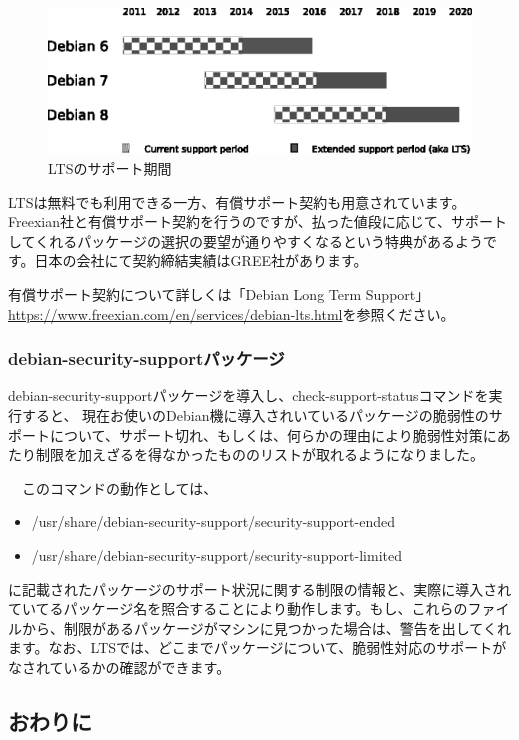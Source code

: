 \documentclass[mingoth,a4paper]{jsarticle}
\begin{document}
\begin{figure}[H]
\begin{center}
 \includegraphics[width=0.7\hsize]{image201506/debian-lts-periods_mono.png}
\end{center}
\caption{LTSのサポート期間}
\end{figure}

 LTSは無料でも利用できる一方、有償サポート契約も用意されています。Freexian社と有償サポート契約を行うのですが、払った値段に応じて、サポートしてくれるパッケージの選択の要望が通りやすくなるという特典があるようです。日本の会社にて契約締結実績はGREE社があります。

 有償サポート契約について詳しくは「Debian Long Term Support」\url{https://www.freexian.com/en/services/debian-lts.html}を参照ください。

\subsubsection{debian-security-supportパッケージ}

 debian-security-supportパッケージを導入し、check-support-statusコマンドを実行すると、
現在お使いのDebian機に導入されいているパッケージの脆弱性のサポートについて、サポート切れ、もしくは、何らかの理由により脆弱性対策にあたり制限を加えざるを得なかったもののリストが取れるようになりました。

　このコマンドの動作としては、
\begin{itemize}
\item  /usr/share/debian-security-support/security-support-ended
\item /usr/share/debian-security-support/security-support-limited
\end{itemize}
に記載されたパッケージのサポート状況に関する制限の情報と、実際に導入されていてるパッケージ名を照合することにより動作します。もし、これらのファイルから、制限があるパッケージがマシンに見つかった場合は、警告を出してくれます。なお、LTSでは、どこまでパッケージについて、脆弱性対応のサポートがなされているかの確認ができます。

\subsection{おわりに}
\end{document}
